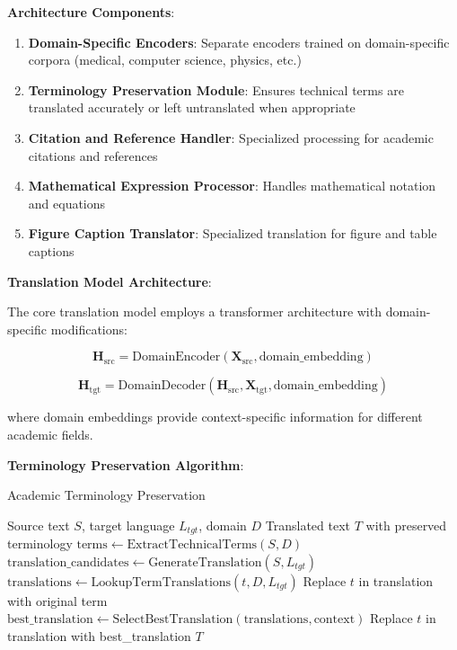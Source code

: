 \documentclass[10pt,twocolumn]{article}
\begin{document}
\textbf{Architecture Components}:
\begin{enumerate}
    \item \textbf{Domain-Specific Encoders}: Separate encoders trained on domain-specific corpora (medical, computer science, physics, etc.)
    \item \textbf{Terminology Preservation Module}: Ensures technical terms are translated accurately or left untranslated when appropriate
    \item \textbf{Citation and Reference Handler}: Specialized processing for academic citations and references
    \item \textbf{Mathematical Expression Processor}: Handles mathematical notation and equations
    \item \textbf{Figure Caption Translator}: Specialized translation for figure and table captions
\end{enumerate}

\textbf{Translation Model Architecture}:

The core translation model employs a transformer architecture with domain-specific modifications:

\begin{equation}
\mathbf{H}_{\text{src}} = \text{DomainEncoder}(\mathbf{X}_{\text{src}}, \text{domain\_embedding})
\end{equation}

\begin{equation}
\mathbf{H}_{\text{tgt}} = \text{DomainDecoder}(\mathbf{H}_{\text{src}}, \mathbf{X}_{\text{tgt}}, \text{domain\_embedding})
\end{equation}

where domain embeddings provide context-specific information for different academic fields.

\textbf{Terminology Preservation Algorithm}:

\begin{algorithm}[H]
\caption{Academic Terminology Preservation}
\label{alg:terminology}
\begin{algorithmic}[1]
\REQUIRE Source text $S$, target language $L_{tgt}$, domain $D$
\ENSURE Translated text $T$ with preserved terminology
\STATE $\text{terms} \leftarrow \text{ExtractTechnicalTerms}(S, D)$
\STATE $\text{translation\_candidates} \leftarrow \text{GenerateTranslation}(S, L_{tgt})$
    \STATE $\text{translations} \leftarrow \text{LookupTermTranslations}(t, D, L_{tgt})$
        \STATE Replace $t$ in translation with original term
    \ELSE
        \STATE $\text{best\_translation} \leftarrow \text{SelectBestTranslation}(\text{translations}, \text{context})$
        \STATE Replace $t$ in translation with best\_translation
    \ENDIF
\ENDFOR
\RETURN $T$
\end{algorithmic}
\end{algorithm}
\end{document}
